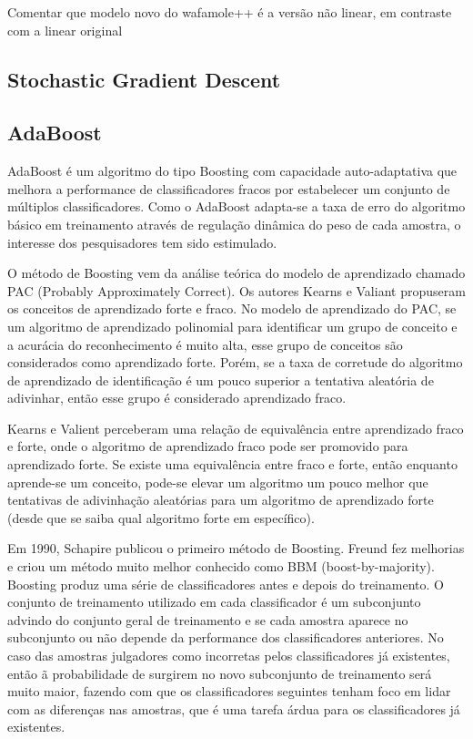 Comentar que modelo novo do wafamole++ é a versão não linear, em contraste com a linear original

\subsection{Stochastic Gradient Descent}

\subsection{AdaBoost}

AdaBoost é um algoritmo do tipo Boosting com capacidade auto-adaptativa que melhora a performance de classificadores fracos por estabelecer um conjunto de múltiplos classificadores. Como o AdaBoost adapta-se a taxa de erro do algoritmo básico em treinamento através de regulação dinâmica do peso de cada amostra, o interesse dos pesquisadores tem sido estimulado.

O método de Boosting vem da análise teórica do modelo de aprendizado chamado PAC (Probably Approximately Correct). Os autores Kearns e Valiant propuseram os conceitos de aprendizado forte e fraco. No modelo de aprendizado do PAC, se um algoritmo de aprendizado polinomial para identificar um grupo de conceito e a acurácia do reconhecimento é muito alta, esse grupo de conceitos são considerados como aprendizado forte. Porém, se a taxa de corretude do algoritmo de aprendizado de identificação é um pouco superior a tentativa aleatória de adivinhar, então esse grupo é considerado aprendizado fraco. 

Kearns e Valient perceberam uma relação de equivalência entre aprendizado fraco e forte, onde o algoritmo de aprendizado fraco pode ser promovido para aprendizado forte.
Se existe uma equivalência entre fraco e forte, então enquanto aprende-se um conceito, pode-se elevar um algoritmo um pouco melhor que tentativas de adivinhação aleatórias para um algoritmo de aprendizado forte (desde que se saiba qual algoritmo forte em específico).

Em 1990, Schapire publicou o primeiro método de Boosting. Freund fez melhorias e criou um método muito melhor conhecido como BBM (boost-by-majority).
Boosting produz uma série de classificadores antes e depois do treinamento. O conjunto de treinamento utilizado em cada classificador é um subconjunto advindo do conjunto geral de treinamento e se cada amostra aparece no subconjunto ou não depende da performance dos classificadores anteriores. No caso das amostras julgadores como incorretas pelos classificadores já existentes, então ã probabilidade de surgirem no novo subconjunto de treinamento será muito maior, fazendo com que os classificadores seguintes tenham foco em lidar com as diferenças nas amostras, que é uma tarefa árdua para os classificadores já existentes.

